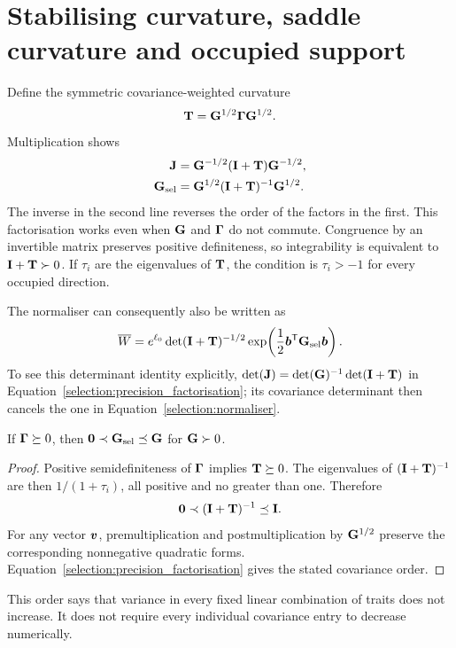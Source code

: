 \section{Stabilising curvature, saddle curvature and occupied support}
\label{selection:curvature_cases}

Define the symmetric covariance-weighted curvature
\begin{equation}
\mathbf{T}=\mathbf{G}^{1/2}\boldsymbol{\Gamma}\mathbf{G}^{1/2}.
\label{selection:T}
\end{equation}
Multiplication shows
\begin{align}
\mathbf{J}
 &=\mathbf{G}^{-1/2}(\mathbf{I}+\mathbf{T})\mathbf{G}^{-1/2},\nonumber\\
\mathbf{G}_{\mathrm{sel}}
 &=\mathbf{G}^{1/2}(\mathbf{I}+\mathbf{T})^{-1}\mathbf{G}^{1/2}.
\label{selection:precision_factorisation}
\end{align}
The inverse in the second line reverses the order of the factors in the
first. This factorisation works even when $\mathbf{G}$ and $\boldsymbol{\Gamma}$ do
not commute. Congruence by an invertible matrix preserves positive
definiteness, so integrability is equivalent to
$\mathbf{I}+\mathbf{T}\succ0$. If $\tau_i$ are the eigenvalues of $\mathbf{T}$,
the condition is $\tau_i>-1$ for every occupied direction.

The normaliser can consequently also be written as
\begin{equation}
\overline W
 =e^{\ell_0}\det(\mathbf{I}+\mathbf{T})^{-1/2}
     \exp\!\left(\frac12\boldsymbol{b}^{\mathsf T}\mathbf{G}_{\mathrm{sel}}\boldsymbol{b}\right).
\label{selection:whitened_normaliser}
\end{equation}
To see this determinant identity explicitly,
$\det(\mathbf{J})=\det(\mathbf{G})^{-1}\det(\mathbf{I}+\mathbf{T})$ in
Equation~\eqref{selection:precision_factorisation}; its covariance
determinant then cancels the one in
Equation~\eqref{selection:normaliser}.

\begin{corollary}
\label{selection:covariance_contraction}
If $\boldsymbol{\Gamma}\succeq0$, then
$\mathbf{0}\prec\mathbf{G}_{\mathrm{sel}}\preceq\mathbf{G}$ for $\mathbf{G}\succ0$.
\end{corollary}
\begin{proof}
Positive semidefiniteness of $\boldsymbol{\Gamma}$ implies $\mathbf{T}\succeq0$.
The eigenvalues of $(\mathbf{I}+\mathbf{T})^{-1}$ are then
$1/(1+\tau_i)$, all positive and no greater than one. Therefore
\[
\mathbf{0}\prec(\mathbf{I}+\mathbf{T})^{-1}\preceq\mathbf{I}.
\]
For any vector $\boldsymbol{v}$, premultiplication and postmultiplication by
$\mathbf{G}^{1/2}$ preserve the corresponding nonnegative quadratic forms.
Equation~\eqref{selection:precision_factorisation} gives the stated
covariance order.
\end{proof}
This order says that variance in every fixed linear combination of traits
does not increase. It does not require every individual covariance entry
to decrease numerically.


